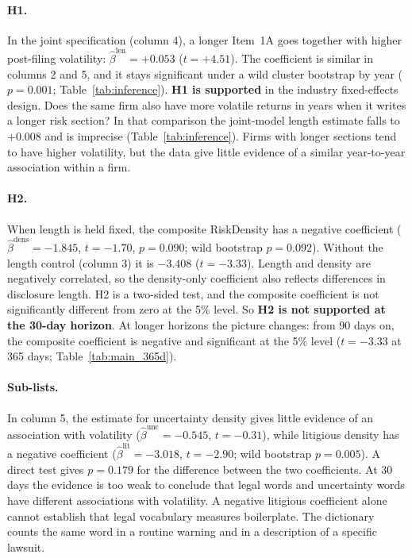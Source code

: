 

\paragraph{H1.} In the joint specification (column 4), a longer Item~1A goes
together with higher post-filing volatility: $\hat\beta^{\text{len}} =
+0.053$ ($t = +4.51$). The coefficient is similar in columns 2 and 5, and it
stays significant under a wild cluster bootstrap by year ($p = 0.001$;
Table~\ref{tab:inference}). \textbf{H1 is supported} in the industry
fixed-effects design. Does the same firm also have more volatile returns in years when it writes a longer risk section? In that comparison the joint-model length estimate falls to $+0.008$ and is imprecise (Table~\ref{tab:inference}). Firms with longer sections tend to have higher volatility, but the data give little evidence of a similar year-to-year association within a firm.

\paragraph{H2.} When length is held fixed, the composite RiskDensity has a
negative coefficient ($\hat\beta^{\text{dens}} = -1.845$, $t = -1.70$,
$p = 0.090$; wild bootstrap $p = 0.092$). Without the length control
(column 3) it is $-3.408$ ($t = -3.33$). Length and density are negatively
correlated, so the density-only coefficient also reflects differences in disclosure length.
H2 is a two-sided test, and the composite coefficient is not significantly
different from zero at the 5\% level. So \textbf{H2 is not supported at the
30-day horizon}. At longer horizons the picture changes: from 90 days on, the
composite coefficient is negative and significant at the 5\% level
($t = -3.33$ at 365 days; Table~\ref{tab:main_365d}).

\paragraph{Sub-lists.} In column 5, the estimate for uncertainty density gives little evidence of an association with
volatility ($\hat\beta^{\text{unc}} = -0.545$, $t = -0.31$), while litigious
density has a negative coefficient ($\hat\beta^{\text{lit}} = -3.018$,
$t = -2.90$; wild bootstrap $p = 0.005$). A direct test gives $p=0.179$ for the difference between the two coefficients. At 30 days the evidence is too weak to conclude that legal words and uncertainty words have different associations with volatility. A negative litigious coefficient alone
cannot establish that legal vocabulary measures boilerplate. The dictionary 
counts the same word in a routine warning and in a description of a specific lawsuit.


